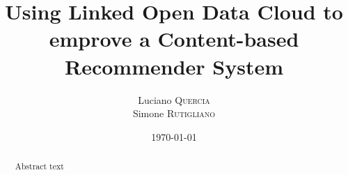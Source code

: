 \documentclass{article}
\title{Using Linked Open Data Cloud to emprove a Content-based Recommender System} %
\author{Luciano \textsc{Quercia}\\Simone \textsc{Rutigliano} }
\date{\today}
\begin{document}
\maketitle	

\begin{abstract}
Abstract text
\end{abstract}














\end{document}

